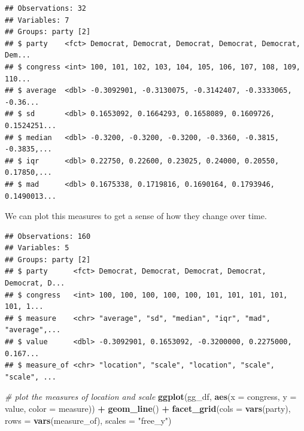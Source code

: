 \documentclass[]{book}
\newenvironment{Shaded}{\begin{snugshade}}{\end{snugshade}}
\newcommand{\CommentTok}[1]{\textcolor[rgb]{0.56,0.35,0.01}{\textit{#1}}}
\newcommand{\DataTypeTok}[1]{\textcolor[rgb]{0.13,0.29,0.53}{#1}}
\newcommand{\KeywordTok}[1]{\textcolor[rgb]{0.13,0.29,0.53}{\textbf{#1}}}
\newcommand{\NormalTok}[1]{#1}
\newcommand{\OperatorTok}[1]{\textcolor[rgb]{0.81,0.36,0.00}{\textbf{#1}}}
\newcommand{\StringTok}[1]{\textcolor[rgb]{0.31,0.60,0.02}{#1}}
\begin{document}
\begin{verbatim}
## Observations: 32
## Variables: 7
## Groups: party [2]
## $ party    <fct> Democrat, Democrat, Democrat, Democrat, Democrat, Dem...
## $ congress <int> 100, 101, 102, 103, 104, 105, 106, 107, 108, 109, 110...
## $ average  <dbl> -0.3092901, -0.3130075, -0.3142407, -0.3333065, -0.36...
## $ sd       <dbl> 0.1653092, 0.1664293, 0.1658089, 0.1609726, 0.1524251...
## $ median   <dbl> -0.3200, -0.3200, -0.3200, -0.3360, -0.3815, -0.3835,...
## $ iqr      <dbl> 0.22750, 0.22600, 0.23025, 0.24000, 0.20550, 0.17850,...
## $ mad      <dbl> 0.1675338, 0.1719816, 0.1690164, 0.1793946, 0.1490013...
\end{verbatim}

We can plot this measures to get a sense of how they change over time.

\begin{Shaded}
\end{Shaded}

\begin{verbatim}
## Observations: 160
## Variables: 5
## Groups: party [2]
## $ party      <fct> Democrat, Democrat, Democrat, Democrat, Democrat, D...
## $ congress   <int> 100, 100, 100, 100, 100, 101, 101, 101, 101, 101, 1...
## $ measure    <chr> "average", "sd", "median", "iqr", "mad", "average",...
## $ value      <dbl> -0.3092901, 0.1653092, -0.3200000, 0.2275000, 0.167...
## $ measure_of <chr> "location", "scale", "location", "scale", "scale", ...
\end{verbatim}

\begin{Shaded}
\begin{Highlighting}[]
\CommentTok{# plot the measures of location and scale}
\KeywordTok{ggplot}\NormalTok{(gg_df, }\KeywordTok{aes}\NormalTok{(}\DataTypeTok{x =}\NormalTok{ congress, }\DataTypeTok{y =}\NormalTok{ value, }\DataTypeTok{color =}\NormalTok{ measure)) }\OperatorTok{+}\StringTok{ }
\StringTok{  }\KeywordTok{geom_line}\NormalTok{() }\OperatorTok{+}\StringTok{ }
\StringTok{  }\KeywordTok{facet_grid}\NormalTok{(}\DataTypeTok{cols =} \KeywordTok{vars}\NormalTok{(party), }\DataTypeTok{rows =} \KeywordTok{vars}\NormalTok{(measure_of), }\DataTypeTok{scales =} \StringTok{"free_y"}\NormalTok{)}
\end{Highlighting}
\end{Shaded}
\end{document}
